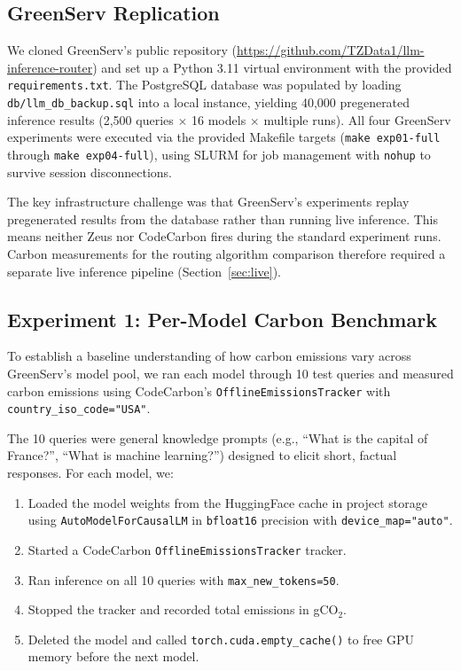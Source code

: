 \documentclass[12pt]{article}
\begin{document}
\subsection{GreenServ Replication}

We cloned GreenServ's public repository
(\url{https://github.com/TZData1/llm-inference-router}) and set up a Python
3.11 virtual environment with the provided \texttt{requirements.txt}. The
PostgreSQL database was populated by loading \texttt{db/llm\_db\_backup.sql}
into a local instance, yielding 40,000 pregenerated inference results (2,500
queries $\times$ 16 models $\times$ multiple runs). All four GreenServ
experiments were executed via the provided Makefile targets
(\texttt{make exp01-full} through \texttt{make exp04-full}), using SLURM
for job management with \texttt{nohup} to survive session disconnections.

The key infrastructure challenge was that GreenServ's experiments replay
pregenerated results from the database rather than running live inference.
This means neither Zeus nor CodeCarbon fires during the standard experiment
runs. Carbon measurements for the routing algorithm comparison therefore
required a separate live inference pipeline (Section~\ref{sec:live}).

\subsection{Experiment 1: Per-Model Carbon Benchmark}
\label{sec:permodel}

To establish a baseline understanding of how carbon emissions vary across
GreenServ's model pool, we ran each model through 10 test queries and
measured carbon emissions using CodeCarbon's
\texttt{OfflineEmissionsTracker} with \texttt{country\_iso\_code="USA"}.

The 10 queries were general knowledge prompts (e.g., ``What is the capital
of France?'', ``What is machine learning?'') designed to elicit short,
factual responses. For each model, we:
\begin{enumerate}
  \item Loaded the model weights from the HuggingFace cache in project
  storage using \texttt{AutoModelForCausalLM} in \texttt{bfloat16}
  precision with \texttt{device\_map="auto"}.
  \item Started a CodeCarbon \texttt{OfflineEmissionsTracker} tracker.
  \item Ran inference on all 10 queries with \texttt{max\_new\_tokens=50}.
  \item Stopped the tracker and recorded total emissions in gCO$_2$.
  \item Deleted the model and called \texttt{torch.cuda.empty\_cache()} to
  free GPU memory before the next model.
\end{enumerate}
\end{document}
